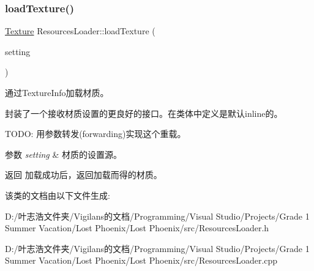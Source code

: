 \subsubsection{\texorpdfstring{load\+Texture()}{loadTexture()}\hspace{0.1cm}{\footnotesize\ttfamily [2/2]}}
{\footnotesize\ttfamily \hyperlink{struct_texture}{Texture} Resources\+Loader\+::load\+Texture (\begin{DoxyParamCaption}\item[{\hyperlink{struct_settings_1_1_texture_info}{Settings\+::\+Texture\+Info}}]{setting }\end{DoxyParamCaption})\hspace{0.3cm}{\ttfamily [inline]}}



通过Texture\+Info加载材质。 

封装了一个接收材质设置的更良好的接口。在类体中定义是默认inline的。

T\+O\+DO\+: 用参数转发(forwarding)实现这个重载。 


\begin{DoxyParams}{参数}
{\em setting} & 材质的设置源。 \\
\hline
\end{DoxyParams}
\begin{DoxyReturn}{返回}
加载成功后，返回加载而得的材质。 
\end{DoxyReturn}


该类的文档由以下文件生成\+:\begin{DoxyCompactItemize}
\item 
D\+:/叶志浩文件夹/\+Vigilans的文档/\+Programming/\+Visual Studio/\+Projects/\+Grade 1 Summer Vacation/\+Lost Phoenix/\+Lost Phoenix/src/Resources\+Loader.\+h\item 
D\+:/叶志浩文件夹/\+Vigilans的文档/\+Programming/\+Visual Studio/\+Projects/\+Grade 1 Summer Vacation/\+Lost Phoenix/\+Lost Phoenix/src/Resources\+Loader.\+cpp\end{DoxyCompactItemize}
